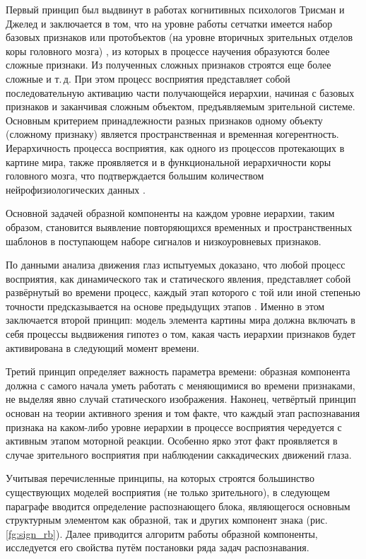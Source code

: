 Первый принцип был выдвинут в работах когнитивных психологов Трисман и Джелед \cite{Triesman1980} и заключается в том, что на уровне работы сетчатки имеется набор базовых признаков  или протобъектов (на уровне вторичных зрительных отделов коры головного мозга) \cite{Rensink2000}, из которых в процессе научения образуются более сложные признаки. Из полученных сложных признаков строятся еще более сложные и т.\,д. При этом процесс восприятия представляет собой последовательную активацию части получающейся иерархии, начиная с базовых признаков и заканчивая сложным объектом, предъявляемым зрительной системе. Основным критерием принадлежности разных признаков одному объекту (сложному признаку) является пространственная и временная когерентность. Иерархичность процесса восприятия, как одного из процессов протекающих в картине мира, также проявляется и в функциональной иерархичности коры головного мозга, что подтверждается большим количеством нейрофизиологических данных \cite{Hawkins2009, Bolotova2011}.

Основной задачей образной компоненты на каждом уровне иерархии, таким образом, становится выявление повторяющихся временных и пространственных шаблонов в поступающем наборе сигналов и низкоуровневых признаков.

По данными анализа движения глаз испытуемых доказано, что любой процесс восприятия, как динамического так и статического явления, представляет собой развёрнутый во времени процесс, каждый этап которого с той или иной степенью точности предсказывается на основе предыдущих этапов \cite{Velichkovsky2006, Hawkins2009}. Именно в этом заключается второй принцип: модель элемента картины мира должна включать в себя процессы выдвижения гипотез о том, какая часть иерархии признаков будет активирована в следующий момент времени.

Третий принцип определяет важность параметра времени: образная компонента должна с самого начала уметь работать с меняющимися во времени признаками, не выделяя явно случай статического изображения. Наконец, четвёртый принцип основан на теории активного зрения и том факте, что каждый этап распознавания признака на каком-либо уровне иерархии в процессе восприятия чередуется с активным этапом моторной реакции. Особенно ярко этот факт проявляется в случае зрительного восприятия при наблюдении саккадических движений глаза.

Учитывая перечисленные принципы, на которых строятся большинство существующих моделей восприятия (не только зрительного), в следующем параграфе вводится определение распознающего блока, являющегося основным структурным элементом как образной, так и других компонент знака (рис. \ref{fg:sign_rb}). Далее приводится алгоритм работы образной компоненты, исследуется его свойства путём постановки ряда задач распознавания.

